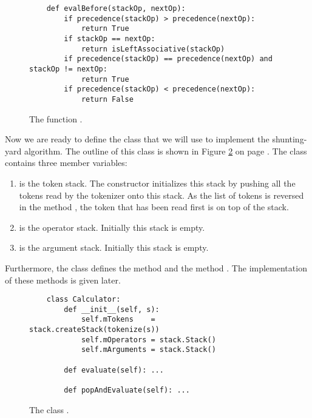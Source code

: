 \begin{figure}[!ht]
\centering
\begin{verbatim}
    def evalBefore(stackOp, nextOp):
        if precedence(stackOp) > precedence(nextOp):
            return True
        if stackOp == nextOp:
            return isLeftAssociative(stackOp)
        if precedence(stackOp) == precedence(nextOp) and stackOp != nextOp:
            return True
        if precedence(stackOp) < precedence(nextOp):
            return False
\end{verbatim}
\vspace*{-0.3cm}
\caption{The function .}
\label{fig:evalBefore}
\end{figure}

Now we are ready to define the class  that we will use to implement the shunting-yard
algorithm.  The outline of this class is shown in Figure \ref{fig:Calculator.ipynb} on page
\pageref{fig:Calculator.ipynb}.  The class contains three member variables:
\begin{enumerate}
\item {} is the token stack.  The constructor initializes this stack by pushing all the tokens
      read by the tokenizer onto this stack.  As the list of tokens is reversed in the method
      , the token that has been read first is on top of the stack.
\item {} is the operator stack.  Initially this stack is empty.
\item {} is the argument stack.  Initially this stack is empty.
\end{enumerate}
Furthermore, the class defines the method  and the method .
The implementation of these methods is given later.

\begin{figure}[!ht]
  \centering
\begin{verbatim}
    class Calculator:
        def __init__(self, s):
            self.mTokens    = stack.createStack(tokenize(s))
            self.mOperators = stack.Stack()
            self.mArguments = stack.Stack()
    
        def evaluate(self): ...

        def popAndEvaluate(self): ...
\end{verbatim}
\vspace*{-0.3cm}
  \caption{The class .}
  \label{fig:Calculator.ipynb}
\end{figure} 

